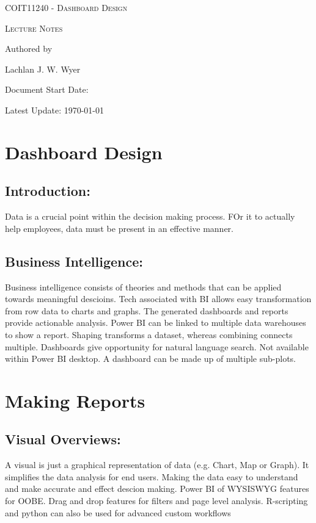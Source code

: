 \documentclass[a5paper]{article}
\date{24\textsuperscript{th} of September 2026}
\begin{document}
	\begin{titlepage}
		\centering
		{\Huge \textsc{COIT11240 - Dashboard Design}\par}
		\vspace{1cm}
		{\Large \textsc{Lecture Notes}\par}
		\vspace{2.5cm}
		\vfill
		Authored by\par
		Lachlan J. W. Wyer
		\vfill
		\makeatletter
		{\large Document Start Date: \@date \par}
		\makeatother
		{\large Latest Update: \today\par}
	\end{titlepage}
	\tableofcontents
	\pagebreak

	\raggedright

	\section{Dashboard Design}
	\subsection{Introduction:}
	Data is a crucial point within the decision making process. FOr it to actually help employees, data must be present in an effective manner.
	\subsection{Business Intelligence:}
	Business intelligence consists of theories and methods that can be applied towards meaningful descioins. Tech associated with BI allows easy transformation from row data to charts and graphs. The generated dashboards and reports provide actionable analysis. Power BI can be linked to multiple data warehouses to show a report. Shaping transforms a dataset, whereas combining connects multiple. Dashboards give opportunity for natural language search. Not available within Power BI desktop. A dashboard can be made up of multiple sub-plots.

	\section{Making Reports}
	\subsection{Visual Overviews:}
	A visual is just a graphical representation of data (e.g. Chart, Map or Graph). It simplifies the data analysis for end users. Making the data easy to understand and make accurate and effect descion making. Power BI of WYSISWYG features for OOBE. Drag and drop features for filters and page level analysis. R-scripting and python can also be used for advanced custom workflows
\end{document}
